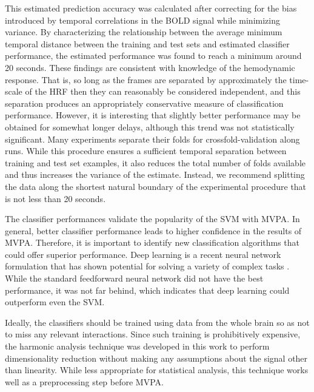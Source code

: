 \documentclass[5p,authoryear]{elsarticle}
\begin{document}
This estimated prediction accuracy was calculated after correcting for the bias introduced by temporal correlations in the BOLD signal while minimizing variance.
By characterizing the relationship between the average minimum temporal distance between the training and test sets and estimated classifier performance, the estimated performance was found to reach a minimum around 20 seconds.
These findings are consistent with knowledge of the hemodynamic response.
That is, so long as the frames are separated by approximately the time-scale of the HRF then they can reasonably be considered independent, and this separation produces an appropriately conservative measure of classification performance. 
However, it is interesting that slightly better performance may be obtained for somewhat longer delays, although this trend was not statistically significant.
Many experiments separate their folds for crossfold-validation along runs.
While this procedure ensures a sufficient temporal separation between training and test set examples, it also reduces the total number of folds available and thus increases the variance of the estimate.
Instead, we recommend splitting the data along the shortest natural boundary of the experimental procedure that is not less than 20 seconds.

The classifier performances validate the popularity of the SVM with MVPA.
In general, better classifier performance leads to higher confidence in the results of MVPA.
Therefore, it is important to identify new classification algorithms that could offer superior performance.
Deep learning \citep{Hinton2006} is a recent neural network formulation that has shown potential for solving a variety of complex tasks \citep{Ciresan2012}.
While the standard feedforward neural network did not have the best performance, it was not far behind, which indicates that deep learning could outperform even the SVM.

Ideally, the classifiers should be trained using data from the whole brain so as not to miss any relevant interactions.
Since such training is prohibitively expensive, the harmonic analysis technique was developed in this work to perform dimensionality reduction without making any assumptions about the signal other than linearity.
While less appropriate for statistical analysis, this technique works well as a preprocessing step before MVPA.
\end{document}
